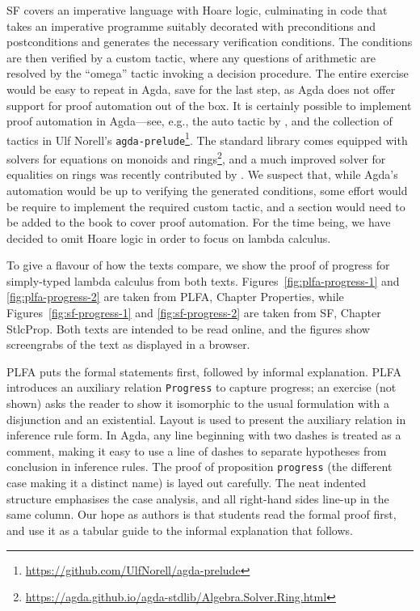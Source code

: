 \documentclass[preprint,authoryear]{elsarticle}
\begin{document}
SF covers an imperative language with Hoare logic, culminating in code that
takes an imperative programme suitably decorated with preconditions and
postconditions and generates the necessary verification conditions. The
conditions are then verified by a custom tactic, where any questions of
arithmetic are resolved by the ``omega'' tactic invoking a decision procedure.
The entire exercise would be easy to repeat in Agda, save for the last step, as
Agda does not offer support for proof automation out of the box. It is 
certainly possible to implement proof automation in Agda---see, e.g., the auto
tactic by \citet{Kokke-2015}, and the collection of tactics in Ulf Norell's
\texttt{agda-prelude}\footnote{\url{https://github.com/UlfNorell/agda-prelude}}.
The standard library comes equipped with solvers for equations on monoids and
rings\footnote{\url{https://agda.github.io/agda-stdlib/Algebra.Solver.Ring.html}},
and a much improved solver for equalities on rings was recently contributed by
\citet{Kidney-2019}.
We suspect that, while Agda's automation would be up to verifying the generated
conditions, some effort would be require to implement the required custom
tactic, and a section would need to be added to the book to cover proof
automation. For the time being, we have decided to omit Hoare logic in order to
focus on lambda calculus.

To give a flavour of how the texts compare, we show the
proof of progress for simply-typed lambda calculus from both texts.
Figures~\ref{fig:plfa-progress-1} and \ref{fig:plfa-progress-2}
are taken from PLFA, Chapter Properties,
while Figures~\ref{fig:sf-progress-1} and \ref{fig:sf-progress-2}
are taken from SF, Chapter StlcProp.
Both texts are intended to be read online,
and the figures show screengrabs of the text as
displayed in a browser.

PLFA puts the formal statements first, followed by informal explanation.
PLFA introduces an auxiliary relation \texttt{Progress} to capture
progress; an exercise (not shown) asks the reader to show it isomorphic
to the usual formulation with a disjunction and an existential.
Layout is used to present the auxiliary relation in inference rule form.
In Agda, any line beginning with two dashes is treated as a comment, making
it easy to use a line of dashes to separate hypotheses from conclusion
in inference rules.  The proof of proposition \texttt{progress} (the different
case making it a distinct name) is layed out carefully. The neat
indented structure emphasises the case analysis, and all right-hand
sides line-up in the same column.  Our hope as authors is that students
read the formal proof first, and use it as a tabular guide
to the informal explanation that follows.
\end{document}
